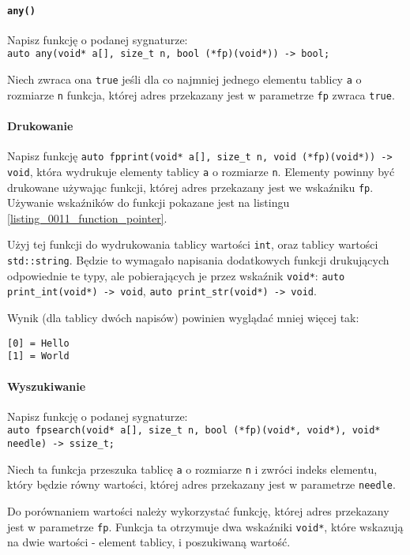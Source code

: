 \documentclass[11pt,a4paper,titlepage,onecolumn]{article}
\begin{document}
\paragraph{\texttt{any()}} Napisz funkcję o podanej sygnaturze:\\
\texttt{auto any(void* a[], size\_t n, bool (*fp)(void*)) -> bool;}

Niech zwraca ona \texttt{true} jeśli dla co najmniej jednego elementu tablicy
\texttt{a} o rozmiarze \texttt{n} funkcja, której adres przekazany jest w
parametrze \texttt{fp} zwraca \texttt{true}.

\paragraph{Drukowanie} Napisz funkcję
\texttt{auto fpprint(void* a[], size\_t n, void (*fp)(void*)) -> void}, która
wydrukuje elementy tablicy \texttt{a} o rozmiarze \texttt{n}. Elementy powinny
być drukowane używając funkcji, której adres przekazany jest we wskaźniku
\texttt{fp}. Używanie wskaźników do funkcji pokazane jest na listingu
\ref{listing_0011_function_pointer}.

Użyj tej funkcji do wydrukowania tablicy wartości \texttt{int}, oraz tablicy
wartości \texttt{std::string}. Będzie to wymagało napisania dodatkowych funkcji
drukujących odpowiednie te typy, ale pobierających je przez wskaźnik
\texttt{void*}:
\texttt{auto print\_int(void*) -> void}, \texttt{auto print\_str(void*) ->
void}.

Wynik (dla tablicy dwóch napisów) powinien wyglądać mniej więcej tak:\\
\begin{lstlisting}
[0] = Hello
[1] = World
\end{lstlisting}

\paragraph{Wyszukiwanie} Napisz funkcję o podanej sygnaturze:\\
\texttt{auto fpsearch(void* a[], size\_t n, bool (*fp)(void*, void*), void*
needle) -> ssize\_t;}

Niech ta funkcja przeszuka tablicę \texttt{a} o rozmiarze \texttt{n} i zwróci
indeks elementu, który będzie równy wartości, której adres przekazany jest w
parametrze \texttt{needle}.

Do porównaniem wartości należy wykorzystać funkcję, której adres przekazany jest
w parametrze \texttt{fp}. Funkcja ta otrzymuje dwa wskaźniki \texttt{void*},
które wskazują na dwie wartości - element tablicy, i poszukiwaną wartość.
\end{document}
